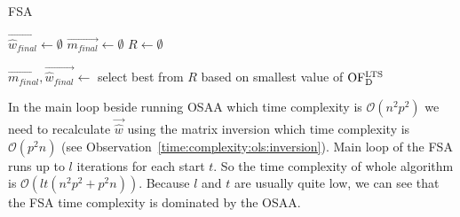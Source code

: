 \begin{algorithm}[H]
    \label{alg:feasible_solution}
        
    \caption{FSA}
    $\vec{\hat{w}_{final}} \gets \emptyset$\;
    $\vec{m_{final}} \gets \emptyset$\;
    $R \gets \emptyset$\;

    $\vec{m_{final}}, \vec{\hat{w}_{final}}  \gets $ select best from $R$ based on smallest value of $\operatorname{OF^{LTS}_D}$\;
    \;
\end{algorithm}



\begin{observation}  \label{time:complexity:fsa}
In the main loop beside running OSAA which time complexity is $\mathcal{O}(n^2p^2)$ we need to recalculate $\vec{\hat{w}}$ using the matrix inversion which time complexity is $\mathcal{O}(p^2n)$ (see Observation~\ref{time:complexity:ols:inversion}).
Main loop of the FSA runs up to $l$ iterations for each start $t$. So the time complexity of whole algorithm is  $\mathcal{O}( lt(n^2p^2 + p^2n)  )$. Because $l$ and $t$ are usually quite low, we can see that the FSA time complexity is dominated by the OSAA. 
\end{observation} 

